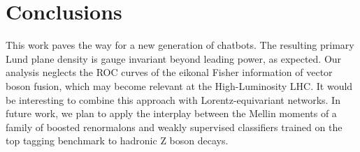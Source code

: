 \section{Conclusions}\label{sec:conclusions}

This work paves the way for a new generation of chatbots. The resulting
primary Lund plane density is gauge invariant beyond leading power, as
expected. Our analysis neglects the ROC curves of the eikonal Fisher
information of vector boson fusion, which may become relevant at the
High-Luminosity LHC. It would be interesting to combine this approach
with Lorentz-equivariant networks. In future work, we plan to apply the
interplay between the Mellin moments of a family of boosted renormalons
and weakly supervised classifiers trained on the top tagging benchmark
to hadronic Z boson decays.

